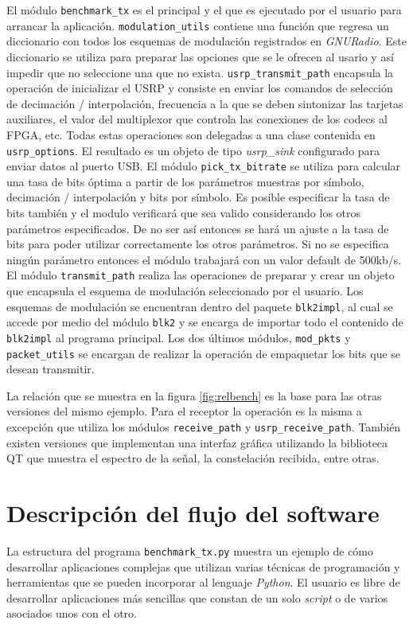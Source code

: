 El m\'odulo \verb|benchmark_tx| es el principal y el que es ejecutado por el usuario para arrancar la
aplicaci\'on. \verb|modulation_utils| contiene una funci\'on que regresa un diccionario con todos los
esquemas de modulaci\'on registrados en \emph{GNURadio}. Este diccionario se utiliza para preparar las
opciones que se le ofrecen al usario y as\'i impedir que no seleccione una que no exista.
\verb|usrp_transmit_path| encapsula la operaci\'on de inicializar el USRP y consiste en enviar los
comandos de selecci\'on de decimaci\'on / interpolaci\'on, frecuencia a la que se deben
sintonizar las tarjetas auxiliares, el valor del multiplexor que controla las conexiones de los codecs al FPGA,
etc. Todas estas operaciones son delegadas a una clase contenida en \verb|usrp_options|. El
resultado es un objeto de tipo \emph{usrp\_sink} configurado para enviar datos al puerto USB. El
m\'odulo \verb|pick_tx_bitrate| se utiliza para calcular una tasa de bits \'optima a partir de los
par\'ametros muestras por s\'imbolo, decimaci\'on / interpolaci\'on y bits por s\'imbolo.
Es posible especificar la tasa de bits tambi\'en y el modulo verificar\'a que sea valido considerando los otros
par\'ametros especificados. De no ser as\'i entonces se har\'a un ajuste a la tasa de bits para poder
utilizar correctamente los otros par\'ametros. Si no se especifica ning\'un par\'ametro entonces el
m\'odulo trabajar\'a con un valor default de 500kb/s. El m\'odulo \verb|transmit_path| realiza las operaciones de preparar y crear
un objeto que encapsula el esquema de modulaci\'on seleccionado por el usuario. Los esquemas de modulaci\'on se encuentran
dentro del paquete \verb|blk2impl|, al cual se accede por medio del m\'odulo \verb|blk2| y se
encarga de importar todo el contenido de \verb|blk2impl| al programa principal. Los dos \'ultimos
m\'odulos, \verb|mod_pkts| y \verb|packet_utils| se encargan de realizar la operaci\'on de
empaquetar los bits que se desean transmitir.

La relaci\'on que se muestra en la figura \ref{fig:relbench} es la base para las otras versiones
del mismo ejemplo. Para el receptor la operaci\'on es la misma a excepci\'on que utiliza los m\'odulos
\verb|receive_path| y \verb|usrp_receive_path|. Tambi\'en existen versiones que implementan una
interfaz gr\'afica utilizando la biblioteca QT que muestra el espectro de la se\~nal, la constelaci\'on
recibida, entre otras.

\section{Descripci\'on del flujo del software}
La estructura del programa \verb|benchmark_tx.py| muestra un ejemplo de c\'omo desarrollar
aplicaciones complejas que utilizan varias t\'ecnicas de programaci\'on y herramientas que se pueden
incorporar al lenguaje \emph{Python}. El usuario es libre de desarrollar aplicaciones m\'as sencillas
que constan de un solo \emph{script} o de varios asociados unos con el otro. 

